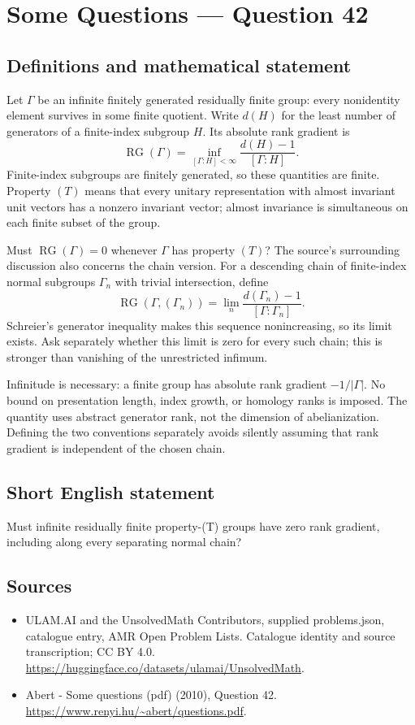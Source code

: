 \documentclass[11pt,a4paper]{article}
\begin{document}
\section*{Some Questions — Question 42}\label{statement}

\subsection{Definitions and mathematical statement}
Let $\Gamma$ be an infinite finitely generated residually finite group: every nonidentity element survives in some finite quotient. Write $d(H)$ for the least number of generators of a finite-index subgroup $H$. Its absolute rank gradient is
\[
 \operatorname{RG}(\Gamma)=\inf_{[\Gamma:H]<\infty}
                         \frac{d(H)-1}{[\Gamma:H]}.
\]
Finite-index subgroups are finitely generated, so these quantities are finite. Property $(T)$ means that every unitary representation with almost invariant unit vectors has a nonzero invariant vector; almost invariance is simultaneous on each finite subset of the group.

Must $\operatorname{RG}(\Gamma)=0$ whenever $\Gamma$ has property $(T)$? The source's surrounding discussion also concerns the chain version. For a descending chain of finite-index normal subgroups $\Gamma_n$ with trivial intersection, define
\[
 \operatorname{RG}(\Gamma,(\Gamma_n))=
 \lim_n\frac{d(\Gamma_n)-1}{[\Gamma:\Gamma_n]}.
\]
Schreier's generator inequality makes this sequence nonincreasing, so its limit exists. Ask separately whether this limit is zero for every such chain; this is stronger than vanishing of the unrestricted infimum.

Infinitude is necessary: a finite group has absolute rank gradient $-1/|\Gamma|$. No bound on presentation length, index growth, or homology ranks is imposed. The quantity uses abstract generator rank, not the dimension of abelianization. Defining the two conventions separately avoids silently assuming that rank gradient is independent of the chosen chain.
\subsection{Short English statement}
Must infinite residually finite property-(T) groups have zero rank gradient, including along every separating normal chain?
\subsection{Sources}
\begin{itemize}
\item[S1] ULAM.AI and the UnsolvedMath Contributors, supplied problems.json, catalogue entry, AMR Open Problem Lists. Catalogue identity and source transcription; CC BY 4.0.
\url{https://huggingface.co/datasets/ulamai/UnsolvedMath}.
\item[S2] Abert - Some questions (pdf) (2010), Question 42. 
\url{https://www.renyi.hu/~abert/questions.pdf}.
\end{itemize}
\end{document}
